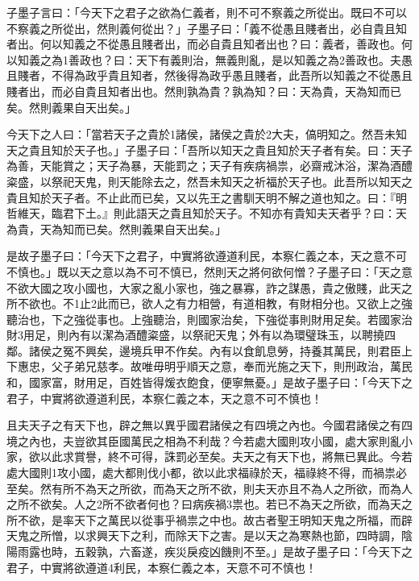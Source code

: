 
\begin{pinyinscope}
子墨子言曰：「今天下之君子之欲為仁義者，則不可不察義之所從出。既曰不可以不察義之所從出，然則義何從出？」子墨子曰：「義不從愚且賤者出，必自貴且知者出。何以知義之不從愚且賤者出，而必自貴且知者出也？曰：義者，善政也。何以知義之為1善政也？曰：天下有義則治，無義則亂，是以知義之為2善政也。夫愚且賤者，不得為政乎貴且知者，然後得為政乎愚且賤者，此吾所以知義之不從愚且賤者出，而必自貴且知者出也。然則孰為貴？孰為知？曰：天為貴，天為知而已矣。然則義果自天出矣。」

今天下之人曰：「當若天子之貴於1諸侯，諸侯之貴於2大夫，傐明知之。然吾未知天之貴且知於天子也。」子墨子曰：「吾所以知天之貴且知於天子者有矣。曰：天子為善，天能賞之；天子為暴，天能罰之；天子有疾病禍祟，必齋戒沐浴，潔為酒醴粢盛，以祭祀天鬼，則天能除去之，然吾未知天之祈福於天子也。此吾所以知天之貴且知於天子者。不止此而已矣，又以先王之書馴天明不解之道也知之。曰：『明哲維天，臨君下土。』則此語天之貴且知於天子。不知亦有貴知夫天者乎？曰：天為貴，天為知而已矣。然則義果自天出矣。」

是故子墨子曰：「今天下之君子，中實將欲遵道利民，本察仁義之本，天之意不可不慎也。」既以天之意以為不可不慎已，然則天之將何欲何憎？子墨子曰：「天之意不欲大國之攻小國也，大家之亂小家也，強之暴寡，詐之謀愚，貴之傲賤，此天之所不欲也。不1止2此而已，欲人之有力相營，有道相教，有財相分也。又欲上之強聽治也，下之強從事也。上強聽治，則國家治矣，下強從事則財用足矣。若國家治財3用足，則內有以潔為酒醴粢盛，以祭祀天鬼；外有以為環璧珠玉，以聘撓四鄰。諸侯之冤不興矣，邊境兵甲不作矣。內有以食飢息勞，持養其萬民，則君臣上下惠忠，父子弟兄慈孝。故唯毋明乎順天之意，奉而光施之天下，則刑政治，萬民和，國家富，財用足，百姓皆得煖衣飽食，便寧無憂。」是故子墨子曰：「今天下之君子，中實將欲遵道利民，本察仁義之本，天之意不可不慎也！

且夫天子之有天下也，辟之無以異乎國君諸侯之有四境之內也。今國君諸侯之有四境之內也，夫豈欲其臣國萬民之相為不利哉？今若處大國則攻小國，處大家則亂小家，欲以此求賞譽，終不可得，誅罰必至矣。夫天之有天下也，將無已異此。今若處大國則1攻小國，處大都則伐小都，欲以此求福祿於天，福祿終不得，而禍祟必至矣。然有所不為天之所欲，而為天之所不欲，則夫天亦且不為人之所欲，而為人之所不欲矣。人之2所不欲者何也？曰病疾禍3祟也。若已不為天之所欲，而為天之所不欲，是率天下之萬民以從事乎禍祟之中也。故古者聖王明知天鬼之所福，而辟天鬼之所憎，以求興天下之利，而除天下之害。是以天之為寒熱也節，四時調，陰陽雨露也時，五穀孰，六畜遂，疾災戾疫凶饑則不至。」是故子墨子曰：「今天下之君子，中實將欲遵道4利民，本察仁義之本，天意不可不慎也！


\end{pinyinscope}
